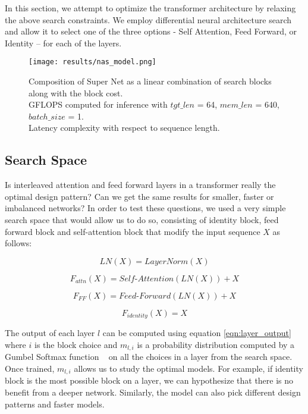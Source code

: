 \documentclass[11pt]{article}
\begin{document}
In this section, we attempt to optimize the transformer architecture by relaxing the above search constraints. We employ differential neural architecture search and allow it to select one of the three options - Self Attention, Feed Forward, or Identity -- for each of the layers.

\begin{figure}[h]
    \centering
    \texttt{[image: results/nas\_model.png]}
    \captionsetup{justification=centering}
    \caption{Composition of Super Net as a linear combination of search blocks along with the block cost.\\
    GFLOPS computed for inference with $tgt\_len$ = 64, $mem\_len$ = 640, $batch\_size$ = 1.  \\
    Latency complexity with respect to sequence length.}
    \label{fig:supernet}
\end{figure}  

\subsection{Search Space}

Is interleaved attention and feed forward layers in a transformer really the optimal design pattern? Can we get the same results for smaller, faster or imbalanced networks? In order to test these questions, we used a very simple search space that would allow us to do so, consisting of identity block, feed forward block and self-attention block that modify the input sequence $X$ as follows:

\begin{equation}
LN(X)= LayerNorm(X)
\end{equation}


\begin{equation}
F_{attn}(X)=Self\mbox{-}Attention(LN(X)) + X
\end{equation}

\begin{equation}
F_{FF}(X)=Feed\mbox{-}Forward(LN(X) ) + X
\end{equation}

\begin{equation}
F_{identity}(X)=X
\end{equation}

The output of each layer $l$ can be computed using equation  \ref{eqn:layer_output} where $i$ is the block choice and $m_{l,i}$ is a probability distribution computed by a Gumbel Softmax function ~\citep{gumbel_softmax1,gumbel_softmax2} on all the choices in a layer from the search space. Once trained, $m_{l,i}$ allows us to study the optimal models. For example, if identity block is the most possible block on a layer, we can hypothesize that there is no benefit from a deeper network. Similarly, the model can also pick different design patterns and faster models.
\end{document}
